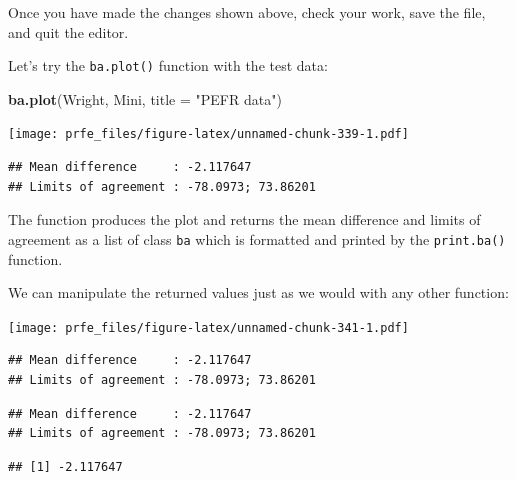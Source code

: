 \documentclass[12pt,a4paper]{book}
\newenvironment{Shaded}{\begin{snugshade}}{\end{snugshade}}
\newcommand{\DataTypeTok}[1]{\textcolor[rgb]{0.13,0.29,0.53}{#1}}
\newcommand{\DecValTok}[1]{\textcolor[rgb]{0.00,0.00,0.81}{#1}}
\newcommand{\KeywordTok}[1]{\textcolor[rgb]{0.13,0.29,0.53}{\textbf{#1}}}
\newcommand{\NormalTok}[1]{#1}
\newcommand{\OperatorTok}[1]{\textcolor[rgb]{0.81,0.36,0.00}{\textbf{#1}}}
\newcommand{\StringTok}[1]{\textcolor[rgb]{0.31,0.60,0.02}{#1}}
\theoremstyle{definition}
\theoremstyle{definition}
\theoremstyle{definition}
\theoremstyle{remark}
\begin{document}
Once you have made the changes shown above, check your work, save the
file, and quit the editor.

Let's try the \texttt{ba.plot()} function with the test data:

\begin{Shaded}
\begin{Highlighting}[]
\KeywordTok{ba.plot}\NormalTok{(Wright, Mini, }\DataTypeTok{title =} \StringTok{"PEFR data"}\NormalTok{)}
\end{Highlighting}
\end{Shaded}

\texttt{[image: prfe\_files/figure-latex/unnamed-chunk-339-1.pdf]}

\begin{verbatim}
## Mean difference     : -2.117647
## Limits of agreement : -78.0973; 73.86201
\end{verbatim}

The function produces the plot and returns the mean difference and
limits of agreement as a list of class \texttt{ba} which is formatted
and printed by the \texttt{print.ba()} function.

We can manipulate the returned values just as we would with any other
function:

\begin{Shaded}
\end{Shaded}

\texttt{[image: prfe\_files/figure-latex/unnamed-chunk-341-1.pdf]}

\begin{verbatim}
## Mean difference     : -2.117647
## Limits of agreement : -78.0973; 73.86201
\end{verbatim}

\begin{verbatim}
## Mean difference     : -2.117647
## Limits of agreement : -78.0973; 73.86201
\end{verbatim}

\begin{verbatim}
## [1] -2.117647
\end{verbatim}
\end{document}
